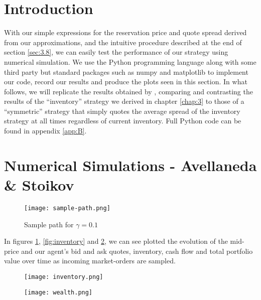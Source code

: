 \section{Introduction}

With our simple expressions for the reservation price and quote
spread derived from our approximations, and the intuitive procedure
described at the end of section \ref{sec:3.8}, we can easily test 
the performance of our strategy using numerical simulation. We use the Python 
programming language along with some third party but standard packages such as 
numpy and matplotlib to implement our code, record our results and produce the 
plots seen in this section. In what follows, we will replicate the results obtained 
by \cite{AS2008}, comparing and contrasting the results of the ``inventory'' strategy
we derived in chapter \ref{chap:3} to those of a ``symmetric'' strategy that simply
quotes the average spread of the inventory strategy at all times regardless of current
inventory. Full Python code can be found in appendix \ref{app:B}.

\section{Numerical Simulations - Avellaneda \& Stoikov}

\begin{figure}[ht!]
    \centering
        \texttt{[image: sample-path.png]}
        \caption{Sample path for $\gamma=0.1$}
        \label{fig:sample-paths}
\end{figure}

In figures \ref{fig:sample-paths}, \ref{fig:inventory} and \ref{fig:pnl}, we can see 
plotted the evolution of the mid-price and our agent's bid and ask quotes, inventory,
cash flow and total portfolio value over time as incoming market-orders are sampled.

\begin{figure}[ht!]
    \centering
    \begin{minipage}{.5\textwidth}
        \centering
        \texttt{[image: inventory.png]}
        \label{fig:inventory}
    \end{minipage}%
    \begin{minipage}{.5\textwidth}
        \centering
        \texttt{[image: wealth.png]}
        \label{fig:pnl}
    \end{minipage}
\end{figure}

